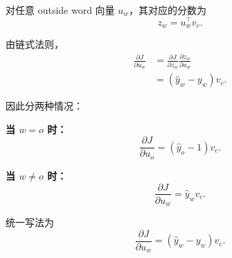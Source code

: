 \documentclass[11pt,a4paper]{ctexart}
\begin{document}
对任意 outside word 向量 $u_w$，其对应的分数为
\[
z_w = u_w^\top v_c.
\]

由链式法则，
\begin{align*}
\frac{\partial J}{\partial u_w}
&= \frac{\partial J}{\partial z_w}\frac{\partial z_w}{\partial u_w} \\
&= (\hat{y}_w - y_w)v_c.
\end{align*}

因此分两种情况：

\textbf{当 $w=o$ 时：}
\[
\frac{\partial J}{\partial u_o} = (\hat{y}_o - 1)v_c.
\]

\textbf{当 $w\ne o$ 时：}
\[
\frac{\partial J}{\partial u_w} = \hat{y}_w v_c.
\]

统一写法为
\[
\boxed{\frac{\partial J}{\partial u_w} = (\hat{y}_w - y_w)v_c}.
\]
\end{document}
